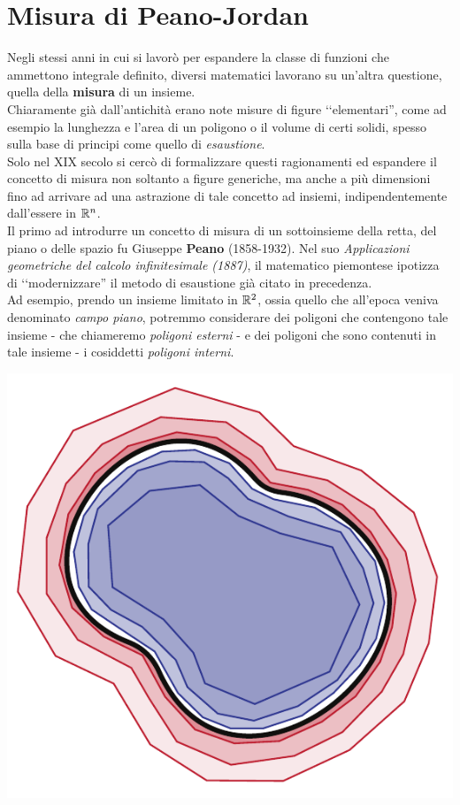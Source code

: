 \section{Misura di Peano-Jordan}
Negli stessi anni in cui si lavorò per espandere la classe di funzioni che ammettono integrale definito, diversi matematici lavorano su un'altra questione, quella della \textbf{misura} di un insieme.\\
Chiaramente già dall'antichità erano note misure di figure ‘‘elementari'', come ad esempio la lunghezza e l'area di un poligono o il volume di certi solidi, spesso sulla base di principi come quello di \textit{esaustione}.\\
Solo nel XIX secolo si cercò di formalizzare questi ragionamenti ed espandere il concetto di misura non soltanto a figure generiche, ma anche a più dimensioni fino ad arrivare ad una astrazione di tale concetto ad insiemi, indipendentemente dall'essere in $\mathbb{R}^n$.\\
Il primo ad introdurre un concetto di misura di un sottoinsieme della retta, del piano o delle spazio fu Giuseppe \textbf{Peano} (1858-1932). Nel suo \textit{Applicazioni geometriche del
calcolo infinitesimale (1887)}, il matematico piemontese ipotizza di ‘‘modernizzare'' il metodo di esaustione già citato in precedenza.\\
Ad esempio, prendo un insieme limitato in $\mathbb{R}^2$, ossia quello che all'epoca veniva denominato \textit{campo piano}, potremmo considerare dei poligoni che contengono tale insieme - che chiameremo \textit{poligoni esterni} - e dei poligoni che sono contenuti in tale insieme - i cosiddetti \textit{poligoni interni}.
\begin{center}
	\includegraphics[trim=0cm 0cm 0cm 0cm, clip, scale=0.71]{images/peanopoligoni.pdf}
\end{center}

